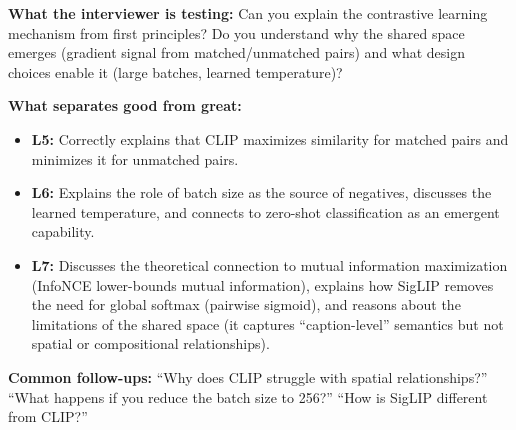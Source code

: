 \begin{interviewq}
\textbf{What the interviewer is testing:} Can you explain the contrastive learning mechanism from first principles? Do you understand why the shared space emerges (gradient signal from matched/unmatched pairs) and what design choices enable it (large batches, learned temperature)?

\textbf{What separates good from great:}
\begin{itemize}
    \item \textbf{L5:} Correctly explains that CLIP maximizes similarity for matched pairs and minimizes it for unmatched pairs.
    \item \textbf{L6:} Explains the role of batch size as the source of negatives, discusses the learned temperature, and connects to zero-shot classification as an emergent capability.
    \item \textbf{L7:} Discusses the theoretical connection to mutual information maximization (InfoNCE lower-bounds mutual information), explains how SigLIP removes the need for global softmax (pairwise sigmoid), and reasons about the limitations of the shared space (it captures ``caption-level'' semantics but not spatial or compositional relationships).
\end{itemize}

\textbf{Common follow-ups:} ``Why does CLIP struggle with spatial relationships?'' ``What happens if you reduce the batch size to 256?'' ``How is SigLIP different from CLIP?''
\end{interviewq}


